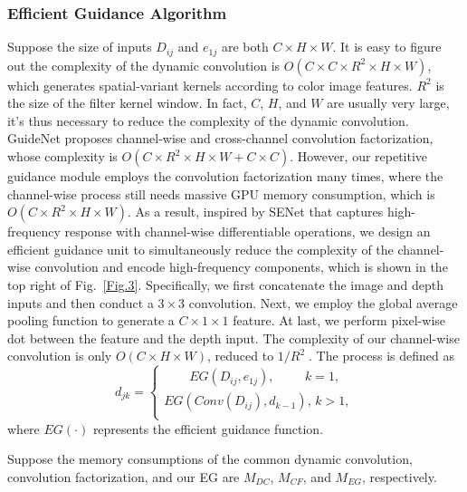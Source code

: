 \documentclass[runningheads]{llncs}
\begin{document}
\subsubsection{Efficient Guidance Algorithm}\label{AG}
Suppose the size of inputs $D_{ij}$ and $e_{1j}$ are both $C\times H\times W$. It is easy to figure out the complexity of the dynamic convolution is $O(C\times C\times {{R}^{2}}\times H\times W)$, which generates spatial-variant kernels according to color image features. $R^2$ is the size of the filter kernel window. In fact, $C$, $H$, and $W$ are usually very large, it's thus necessary to reduce the complexity of the dynamic convolution. GuideNet \cite{tang2020learning} proposes channel-wise and cross-channel convolution factorization, whose complexity is $O(C\times {R^2}\times H\times W + C\times C)$. However, our repetitive guidance module employs the convolution factorization many times, where the channel-wise process still needs massive GPU memory consumption, which is $O(C\times {R^2}\times H\times W)$. As a result, inspired by SENet \cite{hu2018squeeze} that captures high-frequency response with channel-wise differentiable operations, we design an efficient guidance unit to simultaneously reduce the complexity of the channel-wise convolution and encode high-frequency components, which is shown in the top right of Fig.~\ref{Fig.3}. Specifically, we first concatenate the image and depth inputs and then conduct a $3\times 3$ convolution. Next, we employ the global average pooling function to generate a $C\times 1\times 1$ feature. At last, we perform pixel-wise dot between the feature and the depth input. The complexity of our channel-wise convolution is only $O(C\times H \times W)$, reduced to ${1}/{{{R}^{2}}}\;$. The process is defined as
\begin{equation}\label{e3}
{{d}_{jk}}=\left\{ \begin{matrix}
   \qquad EG\left( {{D}_{ij}},{{e}_{1j}} \right),\qquad \ \, k=1,  \\
   EG\left( Conv\left( {{D}_{ij}} \right),{{d}_{k-1}} \right),\, k>1,  \\
\end{matrix} \right.
\end{equation}
where ${EG}\left( \cdot \right)$ represents the efficient guidance function. 


Suppose the memory consumptions of the common dynamic convolution, convolution factorization, and our EG are $M_{DC}$, $M_{CF}$, and $M_{EG}$, respectively.
\end{document}
